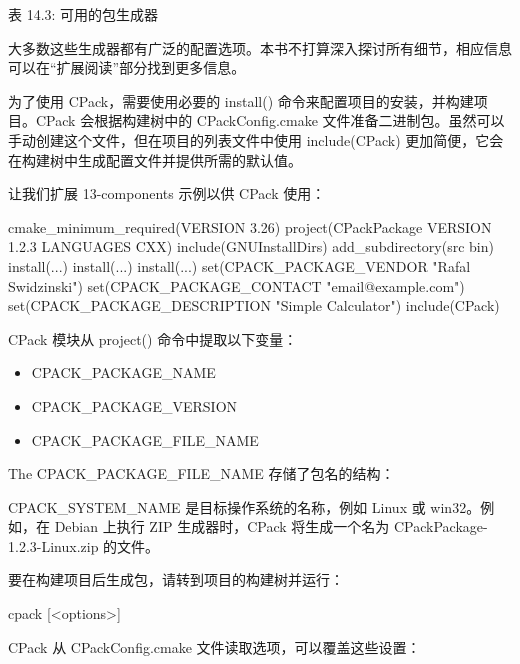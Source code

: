 \begin{center}
表 14.3: 可用的包生成器
\end{center}

大多数这些生成器都有广泛的配置选项。本书不打算深入探讨所有细节，相应信息可以在“扩展阅读”部分找到更多信息。

为了使用 CPack，需要使用必要的 install() 命令来配置项目的安装，并构建项目。CPack 会根据构建树中的 CPackConfig.cmake 文件准备二进制包。虽然可以手动创建这个文件，但在项目的列表文件中使用 include(CPack) 更加简便，它会在构建树中生成配置文件并提供所需的默认值。

让我们扩展 13-components 示例以供 CPack 使用：


\begin{cmake}
cmake_minimum_required(VERSION 3.26)
project(CPackPackage VERSION 1.2.3 LANGUAGES CXX)
include(GNUInstallDirs)
add_subdirectory(src bin)
install(...)
install(...)
install(...)
set(CPACK_PACKAGE_VENDOR "Rafal Swidzinski")
set(CPACK_PACKAGE_CONTACT "email@example.com")
set(CPACK_PACKAGE_DESCRIPTION "Simple Calculator")
include(CPack)
\end{cmake}

CPack 模块从 project() 命令中提取以下变量：

\begin{itemize}
\item
CPACK\_PACKAGE\_NAME

\item
CPACK\_PACKAGE\_VERSION

\item
CPACK\_PACKAGE\_FILE\_NAME
\end{itemize}

The CPACK\_PACKAGE\_FILE\_NAME 存储了包名的结构：


CPACK\_SYSTEM\_NAME 是目标操作系统的名称，例如 Linux 或 win32。例如，在 Debian 上执行 ZIP 生成器时，CPack 将生成一个名为 CPackPackage-1.2.3-Linux.zip 的文件。

要在构建项目后生成包，请转到项目的构建树并运行：

\begin{shell}
cpack [<options>]
\end{shell}

CPack 从 CPackConfig.cmake 文件读取选项，可以覆盖这些设置：


